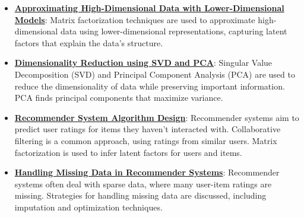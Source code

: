 \documentclass{article}%
\begin{document}
\begin{itemize}[leftmargin=*]%
\item \href{https://purdue.brightspace.com/d2l/common/assets/pdfjs-d2l-dist/1.0.14-legacy/web/viewer.html?file=\%2Fcontent\%2Fenforced\%2F1095467-wl.202510.CS.24300.001\%2F11L2-svd-pca-recommender.pdf\%3Fou\%3D1095467\&lang=en-us\&container=d2l-fileviewer-rendered-pdf\&fullscreen=d2l-fileviewer-rendered-pdf-dialog\&height=667#page=3}{\textbf{Approximating High{-}Dimensional Data with Lower{-}Dimensional Models}}: Matrix factorization techniques are used to approximate high-dimensional data using lower-dimensional representations, capturing latent factors that explain the data's structure.%
\item \href{https://purdue.brightspace.com/d2l/common/assets/pdfjs-d2l-dist/1.0.14-legacy/web/viewer.html?file=\%2Fcontent\%2Fenforced\%2F1095467-wl.202510.CS.24300.001\%2F11L2-svd-pca-recommender.pdf\%3Fou\%3D1095467\&lang=en-us\&container=d2l-fileviewer-rendered-pdf\&fullscreen=d2l-fileviewer-rendered-pdf-dialog\&height=667#page=8}{\textbf{Dimensionality Reduction using SVD and PCA}}: Singular Value Decomposition (SVD) and Principal Component Analysis (PCA) are used to reduce the dimensionality of data while preserving important information. PCA finds principal components that maximize variance.%
\item \href{https://purdue.brightspace.com/d2l/common/assets/pdfjs-d2l-dist/1.0.14-legacy/web/viewer.html?file=\%2Fcontent\%2Fenforced\%2F1095467-wl.202510.CS.24300.001\%2F11L2-svd-pca-recommender.pdf\%3Fou\%3D1095467\&lang=en-us\&container=d2l-fileviewer-rendered-pdf\&fullscreen=d2l-fileviewer-rendered-pdf-dialog\&height=667#page=31}{\textbf{Recommender System Algorithm Design}}: Recommender systems aim to predict user ratings for items they haven't interacted with. Collaborative filtering is a common approach, using ratings from similar users. Matrix factorization is used to infer latent factors for users and items.%
\item \href{https://purdue.brightspace.com/d2l/common/assets/pdfjs-d2l-dist/1.0.14-legacy/web/viewer.html?file=\%2Fcontent\%2Fenforced\%2F1095467-wl.202510.CS.24300.001\%2F11L2-svd-pca-recommender.pdf\%3Fou\%3D1095467\&lang=en-us\&container=d2l-fileviewer-rendered-pdf\&fullscreen=d2l-fileviewer-rendered-pdf-dialog\&height=667#page=38}{\textbf{Handling Missing Data in Recommender Systems}}: Recommender systems often deal with sparse data, where many user-item ratings are missing. Strategies for handling missing data are discussed, including imputation and optimization techniques.%

\end{itemize}
\end{document}
